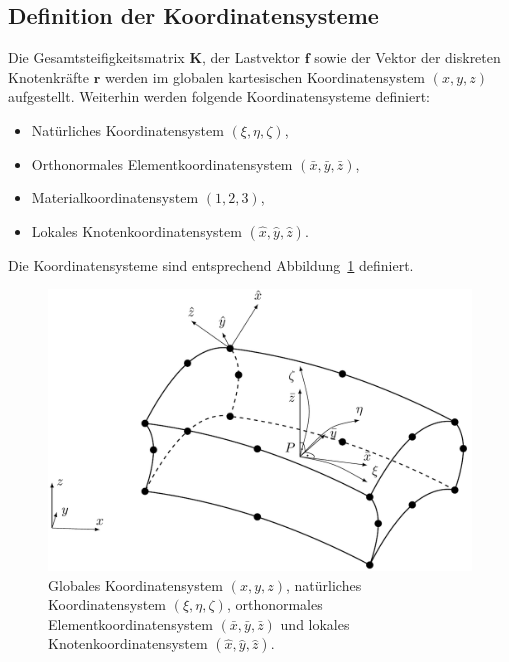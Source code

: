 \documentclass[11pt,titlepage,listof=totoc,bibliography=totoc,twoside]{scrreprt}
\begin{document}
{{\subsection{Definition der Koordinatensysteme}

Die Gesamtsteifigkeitsmatrix $\mathbf{K}$, der Lastvektor $\mathbf{f}$ sowie der Vektor der diskreten Knotenkräfte $\mathbf{r}$ werden im globalen kartesischen Koordinatensystem $\left( x, y, z\right)$ aufgestellt. Weiterhin werden folgende Koordinatensysteme definiert:

\begin{itemize}
 \item Natürliches Koordinatensystem $\left( \xi, \eta, \zeta \right)$,
 \item Orthonormales Elementkoordinatensystem $\left( \bar{x}, \bar{y}, \bar{z} \right)$,
 \item Materialkoordinatensystem $\left(1, 2, 3\right)$,
 \item Lokales Knotenkoordinatensystem $\left(\hat{x}, \hat{y}, \hat{z}\right)$.
\end{itemize}

Die Koordinatensysteme sind entsprechend Abbildung~\ref{fig:lsolid20_koosy} definiert.

\begin{figure}[htb]
\centering
\begin{center}
\includegraphics[scale=0.4]{Bilder/lsolid20_koosy}
\end{center}
\caption{Globales Koordinatensystem $\left( x, y, z \right)$, natürliches Koordinatensystem $\left( \xi, \eta, \zeta \right)$, orthonormales Elementkoordinatensystem $\left( \bar{x}, \bar{y}, \bar{z} \right)$ und lokales Knotenkoordinatensystem $\left(\hat{x}, \hat{y}, \hat{z}\right)$.}
\label{fig:lsolid20_koosy}
\end{figure}

}}
\end{document}
